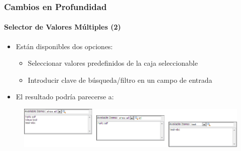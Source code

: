 \begin{frame}[fragile]
	\frametitle{Cambios en Profundidad}
	\framesubtitle{Selector de Valores Múltiples (2)}

	\begin{itemize}
		\item Están disponibles dos opciones:

			\begin{itemize}
				\item Seleccionar valores predefinidos de la caja seleccionable
				\item Introducir clave de búsqueda/filtro en un campo de entrada
			\end{itemize}

		\item El resultado podría parecerse a:
	\end{itemize}

	\begin{figure}
		\includegraphics[width=1\linewidth]{Images/InDepthChanges/MultipleValueSelector.png}
	\end{figure}

\end{frame}


